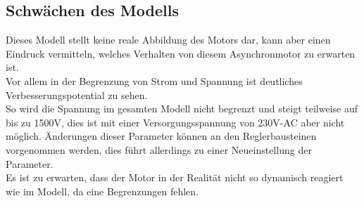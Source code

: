 \subsection{Schwächen des Modells}
Dieses Modell stellt keine reale Abbildung des Motors dar, kann aber einen Eindruck vermitteln, welches Verhalten von diesem Asynchronmotor zu erwarten ist.\\
Vor allem in der Begrenzung von Strom und Spannung ist deutliches Verbesserungspotential zu sehen.\\
So wird die Spannung im gesamten Modell nicht begrenzt und steigt teilweise auf bis zu 1500V, dies ist mit einer Versorgungsspannung von 230V-AC aber nicht möglich. Änderungen dieser Parameter können an den Reglerbausteinen vorgenommen werden, dies führt allerdings zu einer Neueinstellung der Parameter.\\ Es ist zu erwarten, dass der Motor in der Realität nicht so dynamisch reagiert wie im Modell, da eine Begrenzungen fehlen.